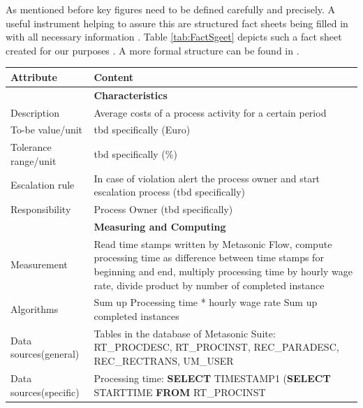 As mentioned before key figures need to be defined carefully and precisely. A useful instrument helping to assure this are structured fact sheets being filled in with all necessary information \cite{book:KennzahlenIT}. Table \ref{tab:FactSgeet} depicts such a fact sheet created for our purposes \cite{book:MonitoringSubjekt}. A more formal structure can be found in \cite{article:ProcessPerfInd}.



\begin{table}[htbp]
	\centering
	\begin{tabular}{|p{3.0 cm } |p{10.0 cm }|}
		\hline
		\textbf{Attribute} & \textbf{Content}\\
		\hline
		\hline
		& \textbf{Characteristics}\\
		\hline
		Description & Average costs of a process activity for a certain period\\
		\hline
		To-be value/unit & tbd specifically (Euro)\\
		\hline
		Tolerance range/unit & tbd specifically (\%)\\
		\hline
		Escalation rule & In case of violation alert the process owner and start escalation process (tbd specifically)\\
		\hline
		Responsibility & Process Owner (tbd specifically)\\
		\hline
		\hline
		& \textbf{Measuring and Computing}\\
		\hline
		Measurement & Read time stamps written by Metasonic Flow, compute processing time as difference between time stamps for beginning and end, multiply processing time by hourly wage rate, divide product by number of completed instance\\
		\hline
		Algorithms & Sum up Processing time * hourly wage rate \newline
					Sum up completed instances\\
		\hline
		Data sources(general) & Tables in the database of Metasonic Suite:\newline
		RT\_PROCDESC, RT\_PROCINST, REC\_PARADESC, REC\_RECTRANS, UM\_USER\\
		\hline
		Data sources(specific) & Processing time:\newline
		\hspace*{4mm} \textbf{SELECT} TIMESTAMP1 \newline
		\hspace*{10mm} (\textbf{SELECT} STARTTIME \newline
		\hspace*{10mm} \textbf{FROM} RT\_PROCINST \newline

\end{tabular}
\end{table}
